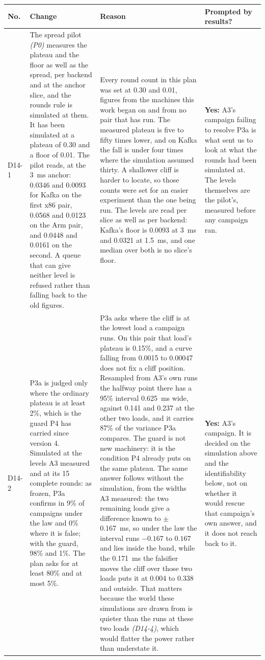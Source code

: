 \documentclass[11pt]{article}
\newcommand{\gl}[1]{{\color{soft}\itshape\small (#1)}}
\begin{document}
{\small
\begin{longtable}{@{}p{1.1cm} >{\raggedright\arraybackslash}p{6.1cm} >{\raggedright\arraybackslash}p{6.0cm} >{\raggedright\arraybackslash}p{2.2cm}@{}}
\toprule
\textbf{No.} & \textbf{Change} & \textbf{Reason} & \textbf{Prompted by results?} \\
\midrule
\endhead
D14-1 & The spread pilot \gl{P0} measures the plateau and the floor as well as the spread, per backend and at the anchor slice, and the rounds rule is simulated at them. It has been simulated at a plateau of 0.30 and a floor of 0.01. The pilot reads, at the 3~ms anchor: 0.0346 and 0.0093 for Kafka on the first x86 pair, 0.0568 and 0.0123 on the Arm pair, and 0.0448 and 0.0161 on the second. A queue that can give neither level is refused rather than falling back to the old figures. & Every round count in this plan was set at 0.30 and 0.01, figures from the machines this work began on and from no pair that has run. The measured plateau is five to fifty times lower, and on Kafka the fall is under four times where the simulation assumed thirty. A shallower cliff is harder to locate, so those counts were set for an easier experiment than the one being run. The levels are read per slice as well as per backend: Kafka's floor is 0.0093 at 3~ms and 0.0321 at 1.5~ms, and one median over both is no slice's floor. & \textbf{Yes:} A3's campaign failing to resolve P3a is what sent us to look at what the rounds had been simulated at. The levels themselves are the pilot's, measured before any campaign ran. \\
D14-2 & P3a is judged only where the ordinary plateau is at least 2\%, which is the guard P4 has carried since version 4. Simulated at the levels A3 measured and at its 15 complete rounds: as frozen, P3a confirms in 9\% of campaigns under the law and 0\% where it is false; with the guard, 98\% and 1\%. The plan asks for at least 80\% and at most 5\%. & P3a asks where the cliff is at the lowest load a campaign runs. On this pair that load's plateau is 0.15\%, and a curve falling from 0.0015 to 0.00047 does not fix a cliff position. Resampled from A3's own runs the halfway point there has a 95\% interval 0.625~ms wide, against 0.141 and 0.237 at the other two loads, and it carries 87\% of the variance P3a compares. The guard is not new machinery: it is the condition P4 already puts on the same plateau. The same answer follows without the simulation, from the widths A3 measured: the two remaining loads give a difference known to $\pm$0.167~ms, so under the law the interval runs $-0.167$ to $0.167$ and lies inside the band, while the 0.171~ms the falsifier moves the cliff over those two loads puts it at 0.004 to 0.338 and outside. That matters because the world these simulations are drawn from is quieter than the runs at these two loads \gl{D14-4}, which would flatter the power rather than understate it. & \textbf{Yes:} A3's campaign. It is decided on the simulation above and the identifiability below, not on whether it would rescue that campaign's own answer, and it does not reach back to it. \\

\end{longtable}}
\end{document}
